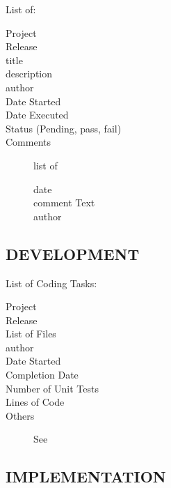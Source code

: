 \documentclass[SDSUThesis.tex]{subfiles}
\begin{document}
    List of:
    \begin{description}
      \item[Project] 
      \item[Release]
      \item[title]
      \item[description]
      \item[author]
      \item[Date Started]
      \item[Date Executed]
      \item[Status (Pending, pass, fail)]
      \item[Comments] list of \\
      \begin{description}
        \item[date]
        \item[comment Text]
        \item[author]
      \end{description}
    \end{description}
    
    \subsection{DEVELOPMENT}
    
    List of Coding Tasks:
    \begin{description}
      \item[Project] 
      \item[Release]
      \item[List of Files]
      \item[author]
      \item[Date Started]
      \item[Completion Date]
      \item[Number of Unit Tests]
      \item[Lines of Code]
      \item[Others] See \cite{Jones2009, Jones2012, Rubin2007, Snipes2013}
    \end{description}
    
    \subsection{IMPLEMENTATION}
    
\end{document}
